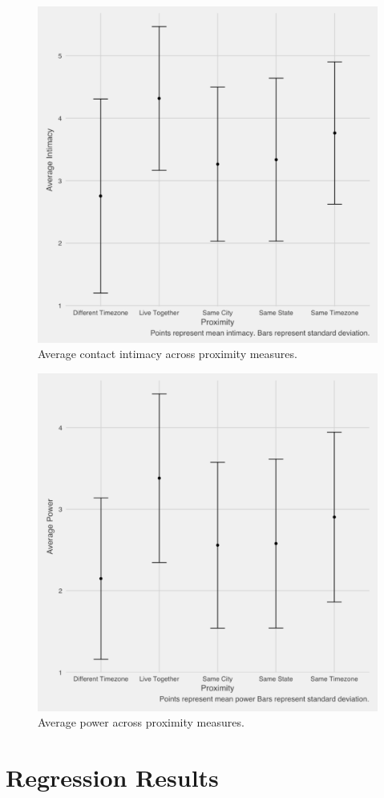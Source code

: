 \documentclass[12pt]{nuthesis}	%
\begin{document}
\begin{figure}[h]
\centering
\includegraphics[width=.7\textwidth]{figures/intimacy_by_distance}
\caption{Average contact intimacy across proximity measures.}
\label{fig:intimacy_by_distance}
\end{figure}

\begin{figure}[h]
\centering
\includegraphics[width=.7\textwidth]{figures/power_by_distance}
\caption{Average power across proximity measures.}
\label{fig:power_by_distance}
\end{figure}



\section{Regression Results}
\end{document}
